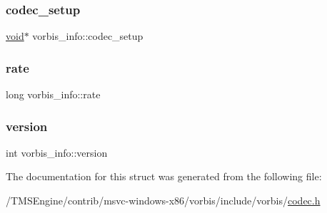 \subsubsection{\texorpdfstring{codec\+\_\+setup}{codec\_setup}}
{\footnotesize\ttfamily \hyperlink{_s_d_l__opengles2__gl2ext_8h_ae5d8fa23ad07c48bb609509eae494c95}{void}$\ast$ vorbis\+\_\+info\+::codec\+\_\+setup}

\mbox{\label{structvorbis__info_a01879ed23ecd9605cf6779ef2663a681}} 
\subsubsection{\texorpdfstring{rate}{rate}}
{\footnotesize\ttfamily long vorbis\+\_\+info\+::rate}

\mbox{\label{structvorbis__info_a2d832259b1e3fbf4d1cd619ab5743612}} 
\subsubsection{\texorpdfstring{version}{version}}
{\footnotesize\ttfamily int vorbis\+\_\+info\+::version}



The documentation for this struct was generated from the following file\+:\begin{DoxyCompactItemize}
\item 
/\+T\+M\+S\+Engine/contrib/msvc-\/windows-\/x86/vorbis/include/vorbis/\hyperlink{codec_8h}{codec.\+h}\end{DoxyCompactItemize}

